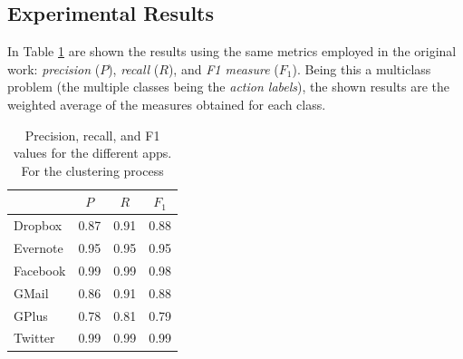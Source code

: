 \subsection{Experimental Results}
In Table \ref{tab:results} are shown the results using the same metrics employed in the original work: \textit{precision} ($P$), \textit{recall} ($R$), and \textit{F1 measure} ($F_1$). Being this a multiclass problem (the multiple classes being the \textit{action labels}), the shown results are the weighted average of the measures obtained for each class.


\begin{table}[h]
\centering
\begin{tabular}{l|ccc}
\hline
         & $P$ & $R$ & $F_1$ \\ \hline
Dropbox  & 0.87    &  0.91   &    0.88   \\
Evernote & 0.95   &  0.95   &    0.95   \\
Facebook &  0.99   &  0.99   &  0.98     \\
GMail    &   0.86  &   0.91  &   0.88    \\
GPlus    &  0.78   &  0.81   &   0.79    \\
Twitter  &  0.99   &  0.99   &   0.99    \\ \hline
\end{tabular}
\caption{Precision, recall, and F1 values for the different apps. For the clustering process}
\label{tab:results}
\end{table}



